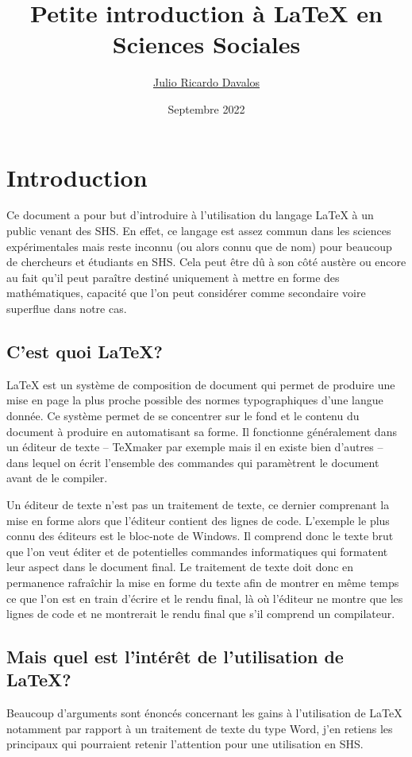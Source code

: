 \documentclass[a4paper, 11pt]{article}\usepackage[]{graphicx}\usepackage[]{xcolor}
\author{\href{mailto:julioricardo.davalos@ehess.fr}{Julio Ricardo Davalos}}
\title{Petite introduction à \LaTeX{} en Sciences Sociales}
\date{Septembre 2022}
\begin{document}
\maketitle

\section*{Introduction}
Ce document a pour but d'introduire à l'utilisation du langage \LaTeX{} à un public venant des SHS. En effet, ce langage est assez commun dans les sciences expérimentales mais reste inconnu (ou alors connu que de nom) pour beaucoup de chercheurs et étudiants en SHS. Cela peut être dû à son côté austère ou encore au fait qu'il peut paraître destiné uniquement à mettre en forme des mathématiques, capacité que l'on peut considérer comme secondaire voire superflue dans notre cas.

\subsection*{C'est quoi \LaTeX ?}
\LaTeX{} est un système de composition de document qui permet de produire une mise en page la plus proche possible des normes typographiques d'une langue donnée. Ce système permet de se concentrer sur le fond et le contenu du document à produire en automatisant sa forme. Il fonctionne généralement dans un éditeur de texte -- \TeX maker par exemple mais il en existe bien d'autres -- dans lequel on écrit l'ensemble des commandes qui paramètrent le document avant de le compiler. 

Un éditeur de texte n'est pas un traitement de texte, ce dernier comprenant la mise en forme alors que l'éditeur contient des lignes de code. L'exemple le plus connu des éditeurs est le bloc-note de Windows. Il comprend donc le texte brut que l'on veut éditer et de potentielles commandes informatiques qui formatent leur aspect dans le document final. Le traitement de texte doit donc en permanence rafraîchir la mise en forme du texte afin de montrer en même temps ce que l'on est en train d'écrire et le rendu final, là où l'éditeur ne montre que les lignes de code et ne montrerait le rendu final que s'il comprend un compilateur.

\subsection*{Mais quel est l'intérêt de l'utilisation de \LaTeX ?}
Beaucoup d'arguments sont énoncés concernant les gains à l'utilisation de \LaTeX{} notamment par rapport à un traitement de texte du type Word, j'en retiens les principaux qui pourraient retenir l'attention pour une utilisation en SHS.
\end{document}

